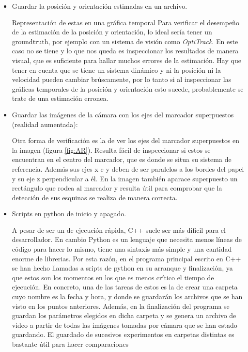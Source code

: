 \begin{itemize}
\item Guardar la posición y orientación estimadas en un archivo. 

	Representación de estas en una gráfica temporal
	Para verificar el desempeño de la estimación de la posición y orientación, lo ideal sería tener un groundtruth, por ejemplo con un sistema de visión como \textit{OptiTrack}. En este caso no se tiene y lo que nos queda es inspeccionar los resultados de manera visual, que es suficiente para hallar muchos errores de la estimación. Hay que tener en cuenta que se tiene un sistema dinámico y ni la posición ni la velocidad pueden cambiar brúscamente, por lo tanto si al inspeccionar las gráficas temporales de la posición y orientación esto sucede, probablemente se trate de una estimación erronea. 

\item Guardar las imágenes de la cámara con los ejes del marcador superpuestos (realidad aumentada):

	Otra forma de verificación es la de ver los ejes del marcador superpuestos en la imagen (figura \ref{fig:AR}). Resulta fácil de inspeccionar si estos se encuentran en el centro del marcador, que es donde se situa su sistema de referencia. Además sus ejes x e y deben de ser paralelos a los bordes del papel y su eje z perpendicular a él. En la imagen también aparace superpuesto un rectángulo que rodea al marcador y resulta útil para comprobar que la detección de sus esquinas se realiza de manera correcta.  
	\figAR

\item Scripts en python de inicio y apagado.

	A pesar de ser un de ejecución rápida, C++ suele ser más dificil para el desarrollador. En cambio Python es un lenguaje que necesita menos líneas de código para hacer lo mismo, tiene una sintaxis más simple y una cantidad enorme de librerias. 
	Por esta razón, en el programa principal escrito en C++ se han hecho llamadas a sripts de python en su arranque y finalización, ya que estos son los momentos en los que es menos crítico el tiempo de ejecución. 
	En concreto, una de las tareas de estos es la de crear una carpeta cuyo nombre es la fecha y hora, y donde se guardarán los archivos que se han visto en los puntos anteriores. Además, en la finalización del programa se guardan los parámetros elegidos en dicha carpeta y se genera un archivo de video a partir de todas las imágenes tomadas por cámara que se han estado guardando.
	El guardado de sucesivos experimentos en carpetas distintas es bastante útil para hacer comparaciones
\end{itemize}

